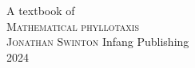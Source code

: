 \newcommand{\jPublicationYear}{2024}

\newlength{\titlepagespacing}

\setlength{\titlepagespacing}{10ex}

\thispagestyle{titlingpage}
{
	\centering
	{\Huge A textbook of }
	\\[3ex]
	{\HUGE\jEmphasisColour	\textsc{Mathematical phyllotaxis}}\\
	\vfill
	{\Huge	\scshape Jonathan Swinton}
	\vfill
	{\Large	Infang Publishing}
	\\[3ex]
	{\Large \textsc{\jPublicationYear}
		\\}
}
\newpage

